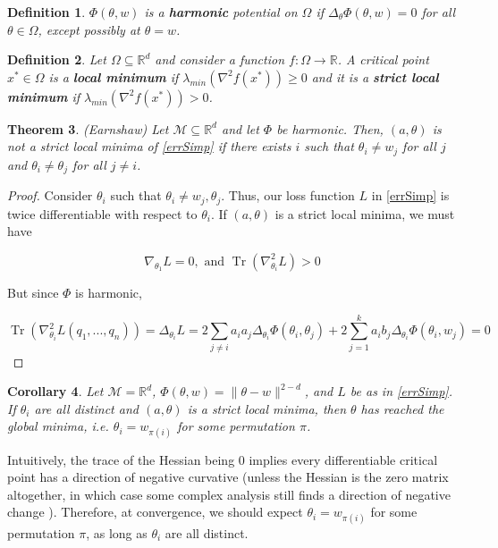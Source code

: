 \documentclass[11pt]{article}
\newtheorem{theorem}{Theorem}[section]
\newtheorem{corollary}[theorem]{Corollary}
\newtheorem{definition}[theorem]{Definition}
\newcommand{\R}{{\mathbb{R}}}
\DeclareMathOperator{\Tr}{Tr}
\begin{document}
\begin{definition}
$\Phi(\theta,w)$ is a {\bf harmonic} potential on $\Omega$ if $\Delta_\theta \Phi(\theta,w) = 0$ for all $\theta \in \Omega$, except possibly at $\theta = w$.
\end{definition}

\begin{definition}
Let $\Omega \subseteq \R^d$ and consider a function $f:\Omega \to \R$. A critical point $x^* \in \Omega$ is a {\bf local minimum} if $\lambda_{min}(\nabla^2 f(x^*)) \geq 0$ and it is a {\bf strict local minimum}  if  $\lambda_{min}(\nabla^2 f(x^*)) > 0$.
\end{definition}

\begin{theorem}\label{Earnshaw} \cite{arnold1985mathematical}(Earnshaw)
Let $\mathcal{M}\subseteq \R^d$ and let $\Phi$ be harmonic. Then, $(a,\theta)$ is not a strict local minima of \eqref{errSimp} if there exists $i$ such that $\theta_i \neq w_j$ for all $j$ and $\theta_i \neq \theta_j$ for all $j\neq i$.
\end{theorem}

\begin{proof}
Consider $\theta_i$ such that $\theta_i \neq w_j, \theta_j$. Thus, our loss function $L$ in \eqref{errSimp} is twice differentiable with respect to $\theta_i$. If $(a,\theta)$ is a strict local minima, we must have

\[\nabla_{\theta_1} L = 0, \text{ and }  \Tr(\nabla^2_{\theta_i}L) > 0\]

But since $\Phi$ is harmonic,

\[\Tr(\nabla^2_{\theta_i}L(q_1,...,q_n)) = \Delta_{\theta_i} L =  2\sum_{ j\neq i} a_ia_j \Delta_{\theta_i}\Phi(\theta_i,\theta_j) + 2\sum_{j=1}^ka_ib_j  \Delta_{\theta_i}\Phi(\theta_i,w_j) = 0\]

\end{proof}

\begin{corollary}
Let $\mathcal{M} = \R^d$, $\Phi(\theta,w) = \|\theta-w\|^{2-d}$, and $L$ be as in \eqref{errSimp}. If $\theta_i$ are all distinct and $(a,\theta)$ is a strict local minima, then $\theta$ has reached the global minima, i.e. $\theta_i = w_{\pi(i)}$ for some permutation $\pi$. 
\end{corollary}

Intuitively, the trace of the Hessian being 0 implies every differentiable critical point has a direction of negative curvative (unless the Hessian is the zero matrix altogether, in which case some complex analysis still finds a direction of negative change \cite{arnold1985mathematical}). Therefore, at convergence, we should expect $\theta_i = w_{\pi(i)}$ for some permutation $\pi$, as long as $\theta_i$ are all distinct. 
\end{document}

